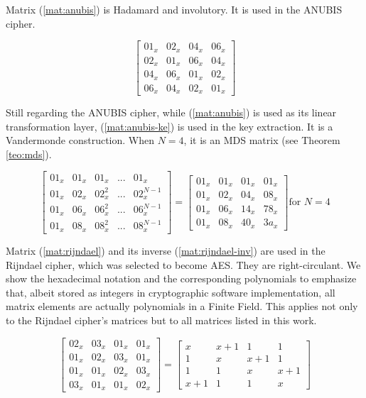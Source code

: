 \documentclass{report}
\begin{document}
Matrix (\ref{mat:anubis}) is Hadamard and involutory. It is used in the ANUBIS \cite{ANUBIS2000} cipher.

\begin{equation}\label{mat:anubis}
\begin{bmatrix}
01_x & 02_x & 04_x & 06_x\\
02_x & 01_x & 06_x & 04_x\\
04_x & 06_x & 01_x & 02_x\\
06_x & 04_x & 02_x & 01_x
\end{bmatrix}
\end{equation}

Still regarding the ANUBIS cipher, while (\ref{mat:anubis}) is used as its linear transformation layer, (\ref{mat:anubis-ke}) is used in the key extraction. It is a Vandermonde construction. When $N = 4$, it is an MDS matrix (see Theorem \ref{teo:mds}).

\begin{equation}\label{mat:anubis-ke}
\begin{bmatrix}
01_x & 01_x & 01_x & ... & 01_x\\
01_x & 02_x & 02_x^2 & ... & 02_x^{N-1}\\
01_x & 06_x & 06_x^2 & ... & 06_x^{N-1}\\
01_x & 08_x & 08_x^2 & ... & 08_x^{N-1}
\end{bmatrix}
=
\begin{bmatrix}
01_x & 01_x & 01_x & 01_x\\
01_x & 02_x & 04_x & 08_x\\
01_x & 06_x & 14_x & 78_x\\
01_x & 08_x & 40_x & 3a_x
\end{bmatrix} \text{for } N=4
\end{equation}

Matrix (\ref{mat:rijndael}) and its inverse (\ref{mat:rijndael-inv}) are used in the Rijndael \cite{DesignOfRijndael2002} cipher, which was selected to become AES. They are right-circulant. We show the hexadecimal notation and the corresponding polynomials to emphasize that, albeit stored as integers in cryptographic software implementation, all matrix elements are actually polynomials in a Finite Field. This applies not only to the Rijndael cipher's matrices but to all matrices listed in this work.

\begin{equation}\label{mat:rijndael}
\begin{bmatrix}
02_x & 03_x & 01_x & 01_x\\
01_x & 02_x & 03_x & 01_x\\
01_x & 01_x & 02_x & 03_x\\
03_x & 01_x & 01_x & 02_x
\end{bmatrix}
=
\begin{bmatrix}
x & x+1 & 1 & 1\\
1 & x & x+1 & 1\\
1 & 1 & x & x+1\\
x+1 & 1 & 1 & x
\end{bmatrix}
\end{equation}
\end{document}

